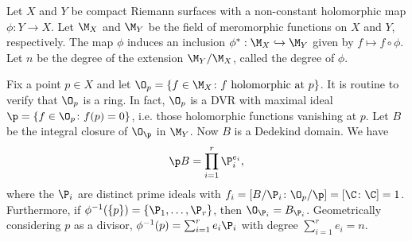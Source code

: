 \begin{ex}
Let $X$ and $Y$ be compact Riemann surfaces with a non-constant holomorphic map $\phi: Y \to X$. Let $\M_X$ and $\M_Y$ be the field of meromorphic functions on $X$ and $Y$, respectively. The map $\phi$ induces an inclusion $\phi^*: \M_X \hookrightarrow \M_Y$ given by $f \mapsto f \circ \phi$. Let $n$ be the degree of the extension $\M_Y/\M_X$, called the degree of $\phi$. 

Fix a point $p \in X$ and let $\O_p=\{f \in \M_X \colon f \text{ holomorphic at }p\}$. It is routine to verify that $\O_p$ is a ring. In fact, $\O_p$ is a DVR with maximal ideal $\p=\{ f \in \O_p \colon f(p)=0\}$, i.e. those holomorphic functions vanishing at $p$. Let $B$ be the integral closure of $\O_\p$ in $\M_Y$. Now $B$ is a Dedekind domain. We have
	\[
	\p B = \prod_{i=1}^r \P_i^{e_i},
	\]
where the $\P_i$ are distinct prime ideals with $f_i=[B/\P_i \colon \O_p/\p]=[\C \colon \C]=1$. Furthermore, if $\phi^{-1}(\{p\})=\{\P_1,\ldots,\P_r\}$, then $\O_{\P_i}=B_{\P_i}$. Geometrically considering $p$ as a divisor, $\phi^{-1}(p)= \sum_{i=1}^r e_i \P_i$ with degree $\sum_{i=1}^r e_i=n$. \xqed
\end{ex}




